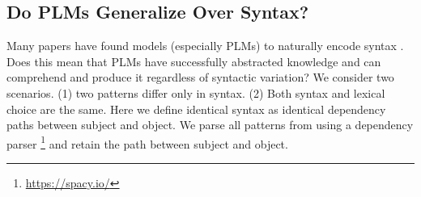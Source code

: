 


% 

% 





% 




\subsection{Do PLMs Generalize Over Syntax?} 



Many papers have found models (especially PLMs) to naturally
encode syntax
\cite{linzen2016assessing,marvin-linzen-2018-targeted,yoav-syntax,hewitt2019structural}.
Does this mean that PLMs have successfully abstracted
knowledge and can comprehend and produce it regardless of
syntactic variation?
We consider two scenarios. (1) two patterns differ only in
syntax. (2) Both  syntax and  lexical choice are the same.
Here we define identical syntax as identical dependency
paths between subject and object.
We parse all patterns from \resource{} using a dependency parser \cite{spacy}\footnote{\url{https://spacy.io/}} and retain the path between  subject and object.

